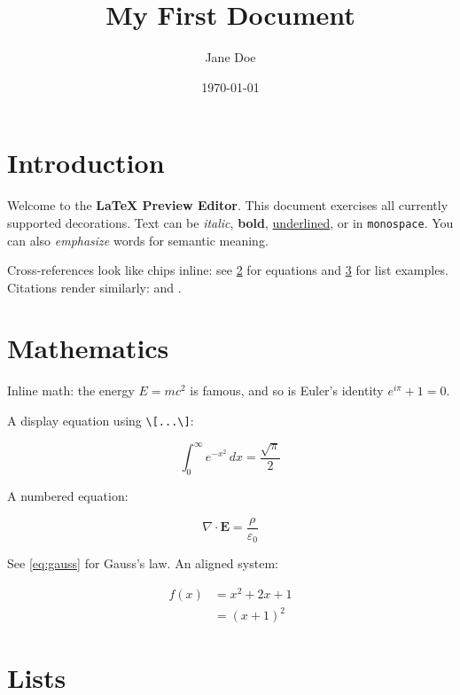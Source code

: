 \documentclass{article}
\title{My First Document}
\author{Jane Doe}
\date{\today}
\begin{document}
\maketitle


\section{Introduction}

Welcome to the \textbf{LaTeX Preview Editor}. This document exercises
all currently supported decorations. Text can be \textit{italic},
\textbf{bold}, \underline{underlined}, or in \texttt{monospace}.
You can also \emph{emphasize} words for semantic meaning.

Cross-references look like chips inline: see \ref{sec:math} for equations
and \ref{sec:lists} for list examples. Citations render similarly:
\cite{einstein1905} and \cite{dirac1930}.

\label{sec:intro}


\section{Mathematics}
\label{sec:math}

Inline math: the energy $E = mc^2$ is famous, and so is Euler's
identity $e^{i\pi} + 1 = 0$.

A display equation using \verb|\[...\]|:

\[
  \int_0^\infty e^{-x^2} \, dx = \frac{\sqrt{\pi}}{2}
\]

A numbered equation:

\begin{equation}
  \nabla \cdot \mathbf{E} = \frac{\rho}{\varepsilon_0}
  \label{eq:gauss}
\end{equation}

See \eqref{eq:gauss} for Gauss's law.  An aligned system:

\begin{align}
  f(x) &= x^2 + 2x + 1 \\
       &= (x + 1)^2
\end{align}


\section{Lists}
\label{sec:lists}
\end{document}
